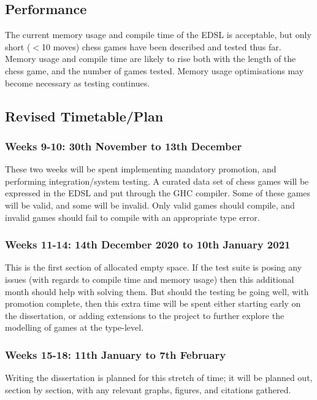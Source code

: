 \documentclass[12pt, a4paper]{scrartcl}
\begin{document}
\subsection{Performance}

The current memory usage and compile time of the EDSL is acceptable, but only short ($<$10 moves) chess games have been described and tested thus far. Memory usage and compile time are likely to rise both with the length of the chess game, and the number of games tested. Memory usage optimisations may become necessary as testing continues.

\subsection{Revised Timetable/Plan}

\subsubsection{Weeks 9-10: 30th November to 13th December}

These two weeks will be spent implementing mandatory promotion, and performing integration/system testing. A curated data set of chess games will be expressed in the EDSL and put through the GHC compiler. Some of these games will be valid, and some will be invalid. Only valid games should compile, and invalid games should fail to compile with an appropriate type error.

\subsubsection{Weeks 11-14: 14th December 2020 to 10th January 2021}

This is the first section of allocated empty space. If the test suite is posing any issues (with regards to compile time and memory usage) then this additional month should help with solving them. But should the testing be going well, with promotion complete, then this extra time will be spent either starting early on the dissertation, or adding extensions to the project to further explore the modelling of games at the type-level.

\subsubsection{Weeks 15-18: 11th January to 7th February}

Writing the dissertation is planned for this stretch of time; it will be planned out, section by section, with any relevant graphs, figures, and citations gathered.
\end{document}
